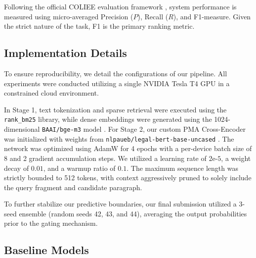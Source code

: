 \documentclass[sigconf]{acmart}
\newcommand{\rev}[1]{{\color{blue}#1}}
\begin{document}
Following the official COLIEE evaluation framework \cite{rabelo2024overview}, system performance is measured using \rev{micro-averaged} Precision ($P$), Recall ($R$), and F1-measure. Given the strict nature of the task, F1 is the primary ranking metric.


\subsection{Implementation Details}

To ensure reproducibility, we detail the configurations of our pipeline. All experiments were conducted utilizing a single NVIDIA Tesla T4 GPU in a constrained cloud environment. 

In Stage 1, text tokenization and sparse retrieval were executed using the \texttt{rank\_bm25} library, while dense embeddings were generated using the 1024-dimensional \texttt{BAAI/\allowbreak bge-m3} model \cite{chen2024bge}. For Stage 2, our custom PMA Cross-Encoder was initialized with weights from \texttt{nlpaueb/\allowbreak legal-bert-\allowbreak base-uncased} \cite{chalkidis2020legal}. The network was optimized using AdamW \cite{loshchilov2017decoupled} for 4 epochs with a per-device batch size of 8 and 2 gradient accumulation steps. We utilized a learning rate of $2\text{e-}5$, a weight decay of $0.01$, and a warmup ratio of $0.1$. The maximum sequence length was strictly bounded to 512 tokens, with context aggressively pruned to solely include the query fragment and candidate paragraph. 

To further stabilize our predictive boundaries, our final submission utilized a 3-seed ensemble (random seeds 42, 43, and 44), averaging the output probabilities prior to the gating mechanism.

\subsection{Baseline Models}
\end{document}
